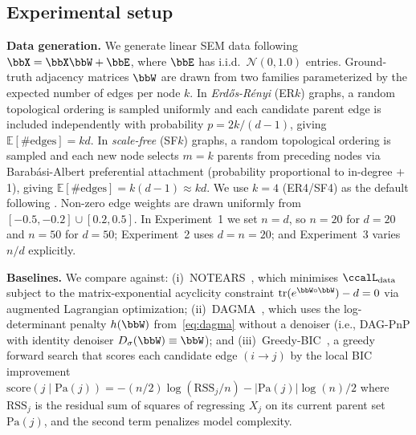 \documentclass[conference]{IEEEtran}
\newcommand{\Ldata}{\ccalL_{\mathrm{data}}}
\newcommand{\sms}[1]{{\color{cyan}{[SS: #1]}}}
\begin{document}
    \subsection{Experimental setup}
    \label{ssec:setup}
    
    \noindent\textbf{Data generation.}
    We generate linear SEM data following $\bbX = \bbX\bbW + \bbE$, where
    $\bbE$ has i.i.d.\ $\mathcal{N}(0, 1.0)$ entries. Ground-truth adjacency matrices $\bbW$ are drawn from two
    families parameterized by the expected number of edges per node $k$.
    In \emph{Erd\H{o}s-R\'enyi} (ER$k$) graphs, a random topological ordering is
    sampled uniformly and each candidate parent edge is included independently
    with probability $p = 2k/(d-1)$, giving $\mathbb{E}[\text{\# edges}] = kd$.
    In \emph{scale-free} (SF$k$) graphs, a random topological ordering is sampled
    and each new node selects $m = k$ parents from preceding nodes via
    Barab\'asi-Albert preferential attachment (probability proportional to
    in-degree $+$ 1), giving $\mathbb{E}[\text{\# edges}] = k(d-1) \approx kd$.
    We use $k = 4$ (ER4/SF4) as the default following
    \cite{bello2022dagma}. Non-zero edge weights are drawn uniformly from
    $[-0.5, -0.2]\cup[0.2, 0.5]$.
    In Experiment~1 we set $n=d$, so $n=20$ for $d=20$ and $n=50$ for $d=50$;
    Experiment~2 uses $d=n=20$; and Experiment~3 varies $n/d$ explicitly.

    \vspace{1mm}
	\noindent\textbf{Baselines.}
    We compare against:
    (i)~{NOTEARS}~\cite{zheng2018dags}, which minimises $\Ldata$ subject to
    the matrix-exponential acyclicity constraint
    $\operatorname{tr}(e^{\bbW\circ\bbW}) - d = 0$ via augmented Lagrangian optimization;
    (ii)~{DAGMA}~\cite{bello2022dagma}, which uses the log-determinant
    penalty $h(\bbW)$ from~\eqref{eq:dagma} without a denoiser (i.e., DAG-PnP
    with identity denoiser $D_\sigma(\bbW)\equiv\bbW$); and
    (iii)~{Greedy-BIC}~\cite{heckerman1995learning}, a greedy forward search that scores each candidate
        edge $(i\to j)$ by the local BIC improvement 
        $\mathrm{score}(j \mid \mathrm{Pa}(j)) = -(n/2)\log(\mathrm{RSS}_j/n) - |\mathrm{Pa}(j)|\log(n)/2$
    where $\mathrm{RSS}_j$ is the residual sum of squares of regressing $X_j$ on
    its current parent set $\mathrm{Pa}(j)$, and the second term penalizes model
    complexity. 
    
\end{document}
